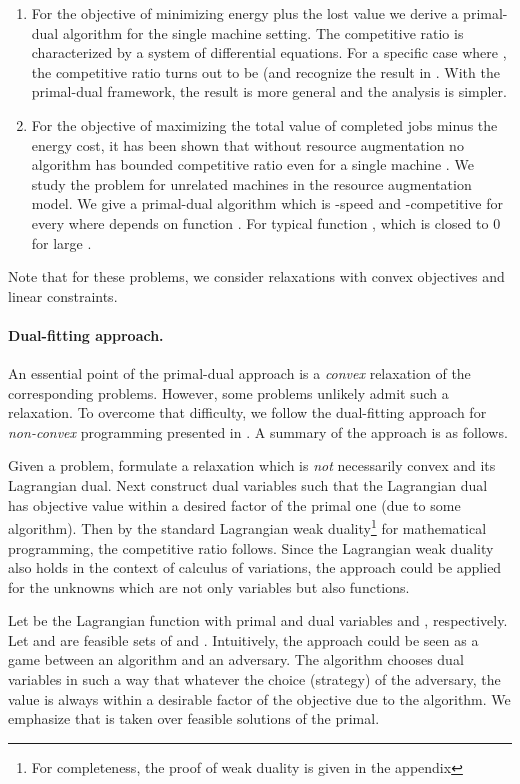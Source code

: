 \documentclass[11pt]{article}
\begin{document}
\begin{enumerate}
	\item For the objective of minimizing energy plus the lost value 
	we derive a primal-dual algorithm for the single machine setting. 
	The competitive ratio is characterized by a system
	of differential equations. For a specific case where , the competitive
	ratio turns out to be  (and recognize the result in \cite{KlingPietrzyk13:Profitable-Scheduling}. 
	With the primal-dual framework, the result is more general and the analysis is simpler.
\item For the objective of maximizing the total value of completed jobs minus the energy cost,
	it has been shown that without resource augmentation 
	no algorithm has bounded competitive ratio even for a single machine \cite{PruhsStein10:How-to-Schedule-When}.
	We study the problem for unrelated machines in the resource augmentation model. We give a primal-dual 
	algorithm which is -speed and -competitive for 
	every  where  depends on function .
	For typical function , 
	which is closed to 0 for large .
\end{enumerate}

Note that for these problems, we consider relaxations with convex objectives and linear constraints.

\paragraph{Dual-fitting approach.} 
An essential point of the primal-dual approach is a \emph{convex} relaxation 
of the corresponding problems. However, some problems unlikely admit such a relaxation. 
To overcome that difficulty, we follow the dual-fitting approach for \emph{non-convex}
programming presented in \cite{Thang13:Lagrangian-Duality}. A summary of the approach is as 
follows.

Given a problem, formulate a relaxation which is \emph{not} necessarily convex and its Lagrangian dual. 
Next construct dual variables such that the Lagrangian dual has objective value within a desired factor 
of the primal one (due to some algorithm). Then by the standard Lagrangian weak 
duality\footnote{For completeness, the proof of weak duality is given in the appendix} 
for mathematical programming, the competitive ratio follows. Since the Lagrangian weak 
duality also holds in the context of calculus of variations, the approach could be applied 
for the unknowns which are not only variables but also functions.  

Let  be the Lagrangian function with primal and dual variables 
and , respectively. 
Let  and  are feasible sets of  and .
Intuitively, the approach could be seen as a game between an algorithm
and an adversary. The algorithm chooses dual variables  in such a way that whatever 
the choice (strategy) of the adversary, the value 
is always within a desirable factor  of the objective due to the algorithm.
We emphasize that  is taken over  feasible solutions 
of the primal.
\end{document}
